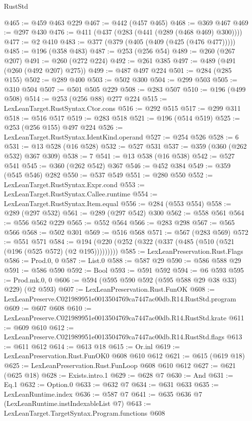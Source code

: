 \begin{lexlean}{RustStd}
\begin{coremodule}
@465 := @459 @463 @229
@467 := @442 (@457 @465)
@468 := @369 @467
@469 := @297 @430
@476 := @411 (@437 (@283 (@441 (@289 (@468 @469) @300))))
@477 := @2 @410
@483 := @377 (@379 (@405 (@409 (@425 (@476 @477)))))
@485 := @196 (@358 @483)
@487 := @253 (@256 @54)
@489 := @260 (@267 @207)
@491 := @260 (@272 @224)
@492 := @261 @385
@497 := @489 (@491 (@260 (@492 @207) @275))
@499 := @487 @497 @224
@501 := @284 (@285 @155)
@502 := @289 @400
@503 := @502 @300
@504 := @299 @503
@505 := @310 @504
@507 := @501 @505 @229
@508 := @283 @507
@510 := @196 (@499 @508)
@514 := @253 (@256 @88) @277 @224
@515 := LexLeanTarget.RustSyntax.Ctor.cons
@516 := @292 @515
@517 := @299 @311
@518 := @516 @517
@519 := @283 @518
@521 := @196 (@514 @519)
@525 := @253 (@256 @155) @497 @224
@526 := LexLeanTarget.RustSyntax.IdentKind.operand
@527 := @254 @526
@528 := 6
@531 := @13 @528 (@16 @528)
@532 := @527 @531
@537 := @359 (@360 (@262 @532) @367 @309)
@538 := 7
@541 := @13 @538 (@16 @538)
@542 := @527 @541
@545 := @360 (@262 @542) @367
@546 := @452 @384
@549 := @359 (@545 @546) @282
@550 := @537 @549
@551 := @280 @550
@552 := LexLeanTarget.RustSyntax.Expr.cond
@553 := LexLeanTarget.RustSyntax.Callee.runtime
@554 := LexLeanTarget.RustSyntax.Item.equal
@556 := @284 (@553 @554)
@558 := @289 (@297 @532)
@561 := @289 (@297 @542) @300
@562 := @558 @561
@564 := @556 @562 @229
@565 := @552 @564
@566 := @283 @298
@567 := @565 @566
@568 := @502 @301
@569 := @516 @568
@571 := @567 (@283 @569)
@572 := @551 @571
@584 := @194 (@220 (@252 (@322 (@337 (@485 (@510 (@521 (@196 (@525 @572) (@2 @195)))))))))
@585 := LexLeanPreservation.Rust.Flags
@586 := Prod.{0, 0}
@587 := List.{0}
@588 := @587 @29
@590 := @586 @588 @29
@591 := @586 @590
@592 := Bool
@593 := @591 @592
@594 := @6 @593
@595 := Prod.mk.{0, 0}
@606 := @594 (@595 @590 @592 (@595 @588 @29 @38 @33) @229) (@2 @593)
@607 := LexLeanPreservation.Rust.FunOK
@608 := LexLeanPreserve.C021989951e0013504769ca7447ac00db.R14.RustStd.program
@609 := @607 @608
@610 := LexLeanPreserve.C021989951e0013504769ca7447ac00db.R14.RustStd.krate
@611 := @609 @610
@612 := LexLeanPreserve.C021989951e0013504769ca7447ac00db.R14.RustStd.flags
@613 := @611 @612
@614 := @613 @18
@615 := Or.inl
@619 := LexLeanPreservation.Rust.FunOK0 @608 @610 @612
@621 := @615 (@619 @18)
@625 := LexLeanPreservation.Rust.FunLoop @608 @610 @612
@627 := @621 (@625 @18)
@628 := Exists.intro.{1}
@629 := @628 @7
@630 := And
@631 := Eq.{1}
@632 := Option.{0}
@633 := @632 @7
@634 := @631 @633
@635 := LexLeanRuntime.index
@636 := @587 @7
@641 := @635 @636 @7 (LexLeanRuntime.instIndexableList @7)
@643 := LexLeanTarget.TargetSyntax.Program.functions @608

\end{coremodule}
\end{lexlean}

